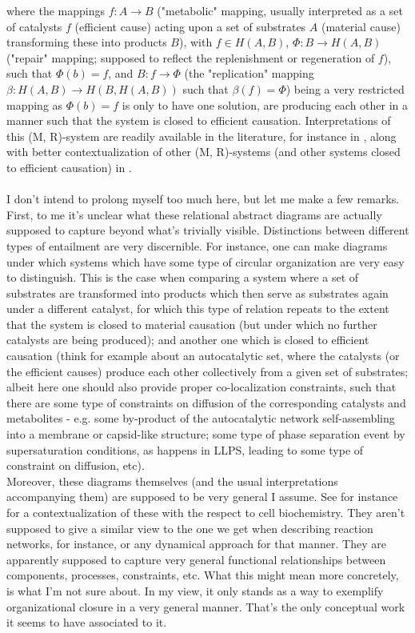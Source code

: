 \documentclass[a4paper,12pt,twoside,leqno]{article}
\begin{document}
where the mappings $f: A \rightarrow B$ ("metabolic" mapping, usually interpreted as a set of catalysts $f$ (efficient cause) acting upon a set of substrates $A$ (material cause) transforming these into products $B$), with $f \in H(A, B)$, $\Phi: B \rightarrow H(A, B)$ ("repair" mapping; supposed to reflect the replenishment or regeneration of $f$), such that $\Phi(b) = f$,  and $B: f \rightarrow \Phi$ (the "replication" mapping $\beta: H(A, B) \rightarrow H(B, H(A, B))$ such that $\beta(f) = \Phi$) being a very restricted mapping as $\Phi(b) = f$ is only to have one solution, are producing each other in a manner such that the system is closed to efficient causation. Interpretations of this (M, R)-system are readily available in the literature, for instance in \cite{letelier2006organizational, soto2011ouroboros, cardenas2010closure}, along with better contextualization of other (M, R)-systems (and other systems closed to efficient causation) in \cite{hofmeyr2021biochemically}.\paragraph*{}
I don't intend to prolong myself too much here, but let me make a few remarks. First, to me it's unclear what these relational abstract diagrams are actually supposed to capture beyond what's trivially visible. Distinctions between different types of entailment are very discernible. For instance, one can make diagrams under which systems which have some type of circular organization are very easy to distinguish. This is the case when comparing a system where a set of substrates are transformed into products which then serve as substrates again under a different catalyst, for which this type of relation repeats to the extent that the system is closed to material causation (but under which no further catalysts are being produced); and another one which is closed to efficient causation (think for example about an autocatalytic set, where the catalysts (or the efficient causes) produce each other collectively from a given set of substrates; albeit here one should also provide proper co-localization constraints, such that there are some type of constraints on diffusion of the corresponding catalysts and metabolites - e.g. some by-product of the autocatalytic network self-assembling into a membrane or capsid-like structure; some type of phase separation event by supersaturation conditions, as happens in LLPS, leading to some type of constraint on diffusion, etc).\\
Moreover, these diagrams themselves (and the usual interpretations accompanying them) are supposed to be very general I assume. See for instance \cite{hofmeyr2021biochemically} for a contextualization of these with the respect to cell biochemistry. They aren't supposed to give a similar view to the one we get when describing reaction networks, for instance, or any dynamical approach for that manner. They are apparently supposed to capture very general functional relationships between components, processes, constraints, etc. What this might mean more concretely, is what I'm not sure about. In my view, it only stands as a way to exemplify organizational closure in a very general manner. That's the only conceptual work it seems to have associated to it.\\
\end{document}
